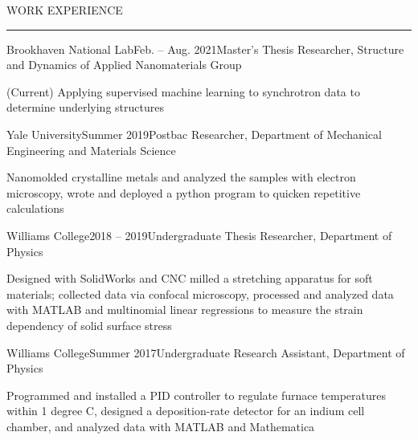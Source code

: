 \documentclass{short_resume} %
\renewenvironment{rSection}[1]{
	\sectionskip
	\textcolor{RoyalPurple}{\MakeUppercase{#1}}
	\sectionlineskip
	\hrule
	\begin{list}{}{
			\setlength{\leftmargin}{1.5em}
		}
		\item[]
	}{
	\end{list}
}
\begin{document}
\vspace{-1em}		
	\begin{rSection}{Work Experience}
			\begin{rSubsection}{Brookhaven National Lab}{Feb. -- Aug. 2021}{Master's Thesis Researcher, Structure and Dynamics of Applied Nanomaterials Group}{}
			\item[] (Current) Applying supervised machine learning to synchrotron data to determine underlying structures
			\vspace{-.2em}
		\end{rSubsection}
		\vspace{-.2em}
		\begin{rSubsection}{Yale University}{Summer 2019}{Postbac Researcher, Department of Mechanical Engineering and Materials Science}{}
			\item[] Nanomolded crystalline metals and analyzed the samples with electron microscopy, wrote and deployed a python program to quicken repetitive calculations 
			\vspace{-.2em}
		\end{rSubsection}
		\vspace{-.2em}
		\begin{rSubsection}{Williams College}{2018 -- 2019}{Undergraduate Thesis Researcher, Department of Physics}{}
			\item[] Designed with SolidWorks and CNC milled a stretching apparatus for soft materials; collected data via confocal microscopy, processed and analyzed data with MATLAB and multinomial linear regressions to measure the strain dependency of solid surface stress
		\end{rSubsection}
		\vspace{-.2em}
		\begin{rSubsection}{Williams College}{Summer 2017}{Undergraduate Research Assistant, Department of Physics}{}
			\item[] Programmed and installed a PID controller to regulate furnace temperatures within 1 degree C, designed a deposition-rate detector for an indium cell chamber, and analyzed data with MATLAB and Mathematica
		\end{rSubsection}


\end{rSection}
\end{document}
